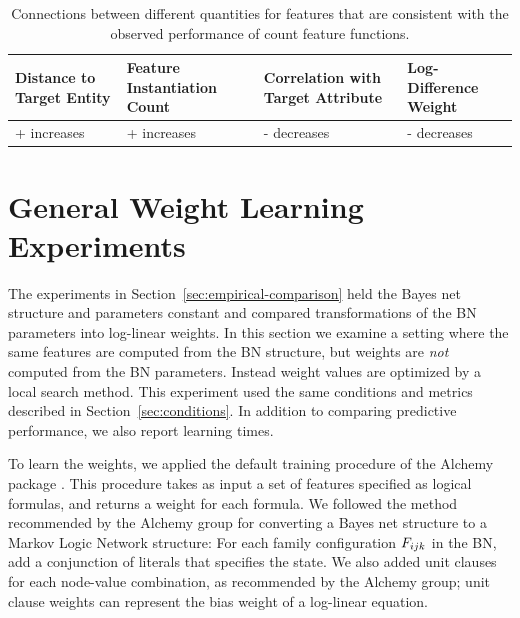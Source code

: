 \documentclass[twoside,11pt]{article}
\begin{document}
\begin{table}[htdp]
\caption{Connections between different quantities for features that are consistent with the observed performance of count feature functions. 
}
\begin{center}
\begin{tabular}{|p{3cm}|p{3cm}p{3cm}p{3cm}|}
Distance to Target Entity & Feature Instantiation Count & Correlation with Target Attribute & Log-Difference Weight \\\hline
+ increases & + increases & - decreases & - decreases
\end{tabular}
\end{center}
\label{table:heuristic}
\end{table}%




\section{General Weight Learning Experiments}
\label{sec:general-weights}

The experiments in Section~\ref{sec:empirical-comparison} held the Bayes net structure and parameters constant and compared transformations of the BN parameters into log-linear weights. In this section we examine a setting where the same features are computed from the BN structure, but weights are {\em not} computed from the BN parameters. Instead weight values are optimized by a local search method. This experiment used the same conditions and metrics described in Section~\ref{sec:conditions}.  In addition to comparing predictive performance, we also report learning times.

To learn the weights, we applied the default training procedure of the Alchemy package \cite{Kok2009a}.  This procedure takes as input a set of features specified as logical formulas, and returns a weight for each formula. We followed the method recommended by the Alchemy group \cite{bib:bayes-convert} for converting a Bayes net structure to a Markov Logic Network structure: For each family configuration $F_{ijk}$ in the BN, add a conjunction of literals that specifies the state. We also added unit clauses for each node-value combination, as recommended by the Alchemy group; unit clause weights can represent the bias weight of a log-linear equation.
\end{document}
